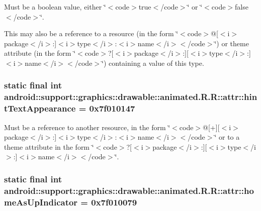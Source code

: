 Must be a boolean value, either \char`\"{}$<$code$>$true$<$/code$>$\char`\"{} or \char`\"{}$<$code$>$false$<$/code$>$\char`\"{}. 

This may also be a reference to a resource (in the form \char`\"{}$<$code$>$@\mbox{[}$<$i$>$package$<$/i$>$:\mbox{]}$<$i$>$type$<$/i$>$:$<$i$>$name$<$/i$>$$<$/code$>$\char`\"{}) or theme attribute (in the form \char`\"{}$<$code$>$?\mbox{[}$<$i$>$package$<$/i$>$:\mbox{]}\mbox{[}$<$i$>$type$<$/i$>$:\mbox{]}$<$i$>$name$<$/i$>$$<$/code$>$\char`\"{}) containing a value of this type. \hypertarget{classandroid_1_1support_1_1graphics_1_1drawable_1_1animated_1_1_r_1_1attr_18a23959afa0b3c3defb839a64797a70}{
\subsubsection[{hintTextAppearance}]{\setlength{\rightskip}{0pt plus 5cm}static final int android::support::graphics::drawable::animated.R.R::attr::hintTextAppearance = 0x7f010147}}
\label{classandroid_1_1support_1_1graphics_1_1drawable_1_1animated_1_1_r_1_1attr_18a23959afa0b3c3defb839a64797a70}


Must be a reference to another resource, in the form \char`\"{}$<$code$>$@\mbox{[}+\mbox{]}\mbox{[}$<$i$>$package$<$/i$>$:\mbox{]}$<$i$>$type$<$/i$>$:$<$i$>$name$<$/i$>$$<$/code$>$\char`\"{} or to a theme attribute in the form \char`\"{}$<$code$>$?\mbox{[}$<$i$>$package$<$/i$>$:\mbox{]}\mbox{[}$<$i$>$type$<$/i$>$:\mbox{]}$<$i$>$name$<$/i$>$$<$/code$>$\char`\"{}. \hypertarget{classandroid_1_1support_1_1graphics_1_1drawable_1_1animated_1_1_r_1_1attr_80e2b907645d9377e4cb1f3841a692f4}{
\subsubsection[{homeAsUpIndicator}]{\setlength{\rightskip}{0pt plus 5cm}static final int android::support::graphics::drawable::animated.R.R::attr::homeAsUpIndicator = 0x7f010079}}
\label{classandroid_1_1support_1_1graphics_1_1drawable_1_1animated_1_1_r_1_1attr_80e2b907645d9377e4cb1f3841a692f4}


